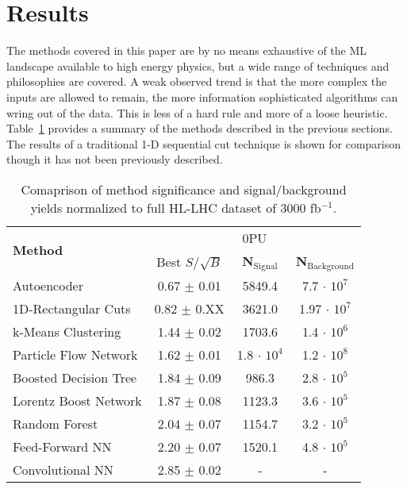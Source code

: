 \section{Results}
\label{sec:results}

The methods covered in this paper are by no means exhaustive of the ML landscape available to high energy physics, but a wide range of techniques and philosophies are covered. A weak observed trend is that the more complex the inputs are allowed to remain, the more information sophisticated algorithms can wring out of the data. This is less of a hard rule and more of a loose heuristic. Table~\ref{tab:summary} provides a summary of the methods described in the previous sections. The results of a traditional 1-D sequential cut technique is shown for comparison though it has not been previously described. 

\begin{table}[h!]
\label{tab:summary}
  \begin{center}
  \begin{tabular}{|l|c|c|c|} %
      \hline\hline
      \multirow{2}{*}{\textbf{Method}} & \multicolumn{3}{c|}{0PU} \\
      \cline{2-4}
      & Best $S/\sqrt{B}$ & \textbf{N$_{\mathrm{Signal}}$} & \textbf{N$_{\mathrm{Background}}$} \\
      \hline
      Autoencoder           & 0.67 $\pm$ 0.01 & 5849.4 & 7.7 $\cdot$ $10^7$ \\
      1D-Rectangular Cuts   & 0.82 $\pm$ 0.XX & 3621.0 & 1.97 $\cdot$ $10^7$ \\
      k-Means Clustering    & 1.44 $\pm$ 0.02 & 1703.6 & 1.4 $\cdot$ $10^6$ \\
      Particle Flow Network & 1.62 $\pm$ 0.01 & 1.8 $\cdot$ $10^4$ & 1.2 $\cdot$ $10^8$ \\
      Boosted Decision Tree & 1.84 $\pm$ 0.09 & 986.3  & 2.8 $\cdot$ $10^5$ \\
      Lorentz Boost Network & 1.87 $\pm$ 0.08 & 1123.3 & 3.6 $\cdot$ $10^5$ \\
      Random Forest         & 2.04 $\pm$ 0.07 & 1154.7 & 3.2 $\cdot$ $10^5$ \\
      Feed-Forward NN       & 2.20 $\pm$ 0.07 & 1520.1 & 4.8 $\cdot$ $10^5$ \\
      Convolutional NN      & 2.85 $\pm$ 0.02 & - & - \\
      \hline\hline
    \end{tabular}
    \caption{Comaprison of method significance and signal/background yields normalized to full HL-LHC dataset of 3000 fb$^{-1}$.}
  \end{center}
\end{table}

